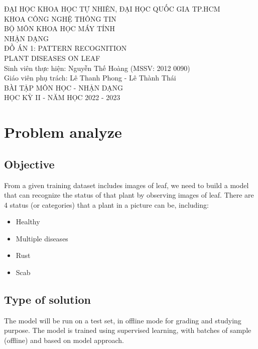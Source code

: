\documentclass[12pt, a4paper]{article}
\begin{document}
	

	\begin{titlepage}
		\centering
		\large
		ĐẠI HỌC KHOA HỌC TỰ NHIÊN, ĐẠI HỌC QUỐC GIA TP.HCM\\[.1in]
		KHOA CÔNG NGHỆ THÔNG TIN\\BỘ MÔN KHOA HỌC MÁY TÍNH\\
		\vfill
		\huge NHẬN DẠNG\\[.1in]
		\LARGE ĐỒ ÁN 1: PATTERN RECOGNITION\\PLANT DISEASES ON LEAF\\
		\vfill
		\RaggedRight
		\large
		Sinh viên thực hiện: Nguyễn Thế Hoàng (MSSV: 2012 0090)\\[.1in]
		Giáo viên phụ trách: Lê Thanh Phong - Lê Thành Thái\\[.2in]
		\Centering
		BÀI TẬP MÔN HỌC - NHẬN DẠNG\\[.1in]
		HỌC KỲ II - NĂM HỌC 2022 - 2023
	\end{titlepage}
	
	\newpage	
	
	
	\section{Problem analyze}
	
	
	\subsection{Objective}
	
	From a given training dataset includes images of leaf, we need to build a model that can recognize the status of that plant by observing images of leaf. There are 4 status (or categories) that a plant in a picture can be, including:
	
	\begin{itemize}
		\item Healthy
		\item Multiple diseases
		\item Rust
		\item Scab
	\end{itemize}
	
	\subsection{Type of solution}
	
	The model will be run on a test set, in offline mode for grading and studying purpose. The model is trained using supervised learning, with batches of sample (offline) and based on model approach.
	
\end{document}
